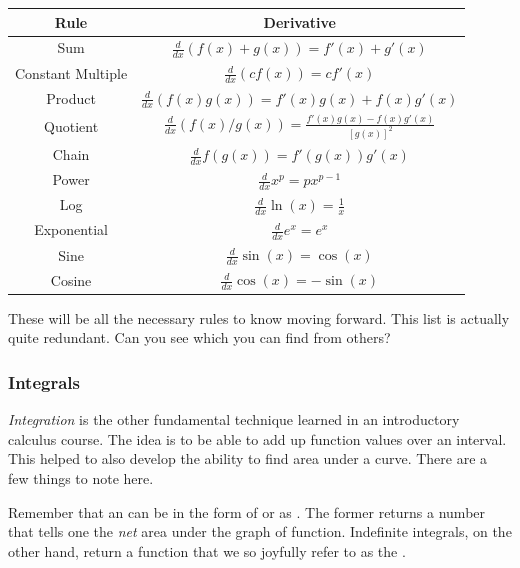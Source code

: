     
    \begin{table}[H]
        \centering
        \renewcommand{\arraystretch}{2.5}
        \begin{tabular}{c|c}
            Rule & Derivative\\
            \hline
            Sum & $\displaystyle{\frac{d}{dx}(f(x)+g(x))=f'(x)+g'(x)}$\\
            \hline
            Constant Multiple & $\displaystyle{\frac{d}{dx}(c f(x))=cf'(x)}$\\
            \hline
            Product & $\displaystyle{\frac{d}{dx}(f(x)g(x))=f'(x)g(x)+f(x)g'(x)}$\\
            \hline
            Quotient & $\displaystyle{\frac{d}{dx}(f(x)/g(x))}=\frac{f'(x)g(x)-f(x)g'(x)}{\left[g(x)\right]^2}$\\
            \hline
            Chain & $\displaystyle{\frac{d}{dx}f(g(x))=f'(g(x))g'(x)}$\\
            \hline
            Power & $\displaystyle{\frac{d}{dx}x^p=px^{p-1}}$\\
            \hline
            Log & $\displaystyle{\frac{d}{dx}\ln(x)=\frac{1}{x}}$\\
            \hline
            Exponential & $\displaystyle{\frac{d}{dx}e^x=e^x}$\\
            \hline
            Sine & $\displaystyle{\frac{d}{dx}\sin(x)=\cos(x)}$\\
            \hline
            Cosine & $\displaystyle{\frac{d}{dx}\cos(x)=-\sin(x)}$
        \end{tabular}
        \label{tab:der_rules}
    \end{table}
    These will be all the necessary rules to know moving forward.  This list is actually quite redundant. Can you see which you can find from others?
    
    
    \subsubsection{Integrals}
    \emph{Integration} is the other fundamental technique learned in an introductory calculus course.  The idea is to be able to add up function values over an interval. This helped to also develop the ability to find area under a curve.  There are a few things to note here.
    
    Remember that an  can be in the form of  or as . The former returns a number that tells one the \emph{net} area under the graph of function.  Indefinite integrals, on the other hand, return a function that we so joyfully refer to as the . 
    
